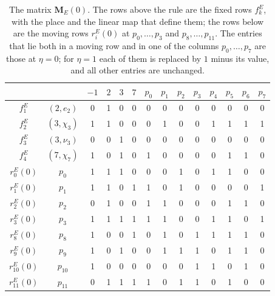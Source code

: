 \begin{table}[htbp]
\centering
\setlength{\tabcolsep}{4.2pt}
\caption{The matrix $\mathbf M_E(0)$. The rows above the rule are the fixed rows $f^E_k$, with the place and the linear map that define them; the rows below are the moving rows $r^E_i(0)$ at $p_0,\dots,p_3$ and $p_8,\dots,p_{11}$. The entries that lie both in a moving row and in one of the columns $p_0,\dots,p_7$ are those at $\eta=0$; for $\eta=1$ each of them is replaced by $1$ minus its value, and all other entries are unchanged.}
\label{tab:r6-ME}
\begin{tabular}{cc@{\hspace{10pt}}cccc@{\hspace{12pt}}cccccccc}
\toprule
 & & $-1$ & $2$ & $3$ & $7$ & $p_0$ & $p_1$ & $p_2$ & $p_3$ & $p_4$ & $p_5$ & $p_6$ & $p_7$\\
\midrule
$f^E_1$ & $(2,e_2)$ & 0 & 1 & 0 & 0 & 0 & 0 & 0 & 0 & 0 & 0 & 0 & 0 \\
$f^E_2$ & $(3,\chi_3)$ & 1 & 1 & 0 & 0 & 0 & 1 & 0 & 0 & 1 & 1 & 1 & 1 \\
$f^E_3$ & $(3,\nu_3)$ & 0 & 0 & 1 & 0 & 0 & 0 & 0 & 0 & 0 & 0 & 0 & 0 \\
$f^E_4$ & $(7,\chi_7)$ & 1 & 0 & 1 & 0 & 1 & 0 & 0 & 0 & 0 & 1 & 1 & 0 \\
\midrule
$r^{E}_0(0)$ & $p_0$ & 1 & 1 & 1 & 0 & 0 & 0 & 1 & 0 & 1 & 1 & 0 & 0 \\
$r^{E}_1(0)$ & $p_1$ & 1 & 1 & 0 & 1 & 1 & 0 & 1 & 0 & 0 & 0 & 0 & 1 \\
$r^{E}_2(0)$ & $p_2$ & 0 & 1 & 0 & 0 & 1 & 1 & 0 & 0 & 0 & 1 & 1 & 0 \\
$r^{E}_3(0)$ & $p_3$ & 1 & 1 & 1 & 1 & 1 & 1 & 0 & 0 & 1 & 1 & 0 & 1 \\
$r^{E}_8(0)$ & $p_8$ & 1 & 0 & 0 & 1 & 0 & 1 & 0 & 1 & 1 & 1 & 1 & 0 \\
$r^{E}_9(0)$ & $p_9$ & 1 & 0 & 1 & 0 & 0 & 1 & 1 & 1 & 0 & 1 & 1 & 0 \\
$r^{E}_{10}(0)$ & $p_{10}$ & 1 & 0 & 0 & 0 & 0 & 0 & 0 & 1 & 1 & 0 & 1 & 0 \\
$r^{E}_{11}(0)$ & $p_{11}$ & 0 & 1 & 1 & 1 & 1 & 0 & 1 & 1 & 0 & 1 & 0 & 0 \\
\bottomrule
\end{tabular}
\end{table}

